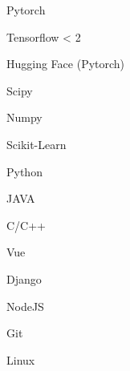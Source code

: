 

\vspace{-.2cm}
\begin{multicols}{4}
	\begin{cvitems}
		\item Pytorch
		\item Tensorflow < 2
		\item Hugging Face (Pytorch)
		\item Scipy
		\item Numpy
		\item Scikit-Learn
	\end{cvitems}
\end{multicols}

\vspace{-.2cm}
\begin{multicols}{8}
	\begin{cvitems}
		\item Python
		\item JAVA
		\item C/C++
		\item Vue
		\item Django
        \item NodeJS
		\item Git
		\item Linux
	\end{cvitems}
\end{multicols}